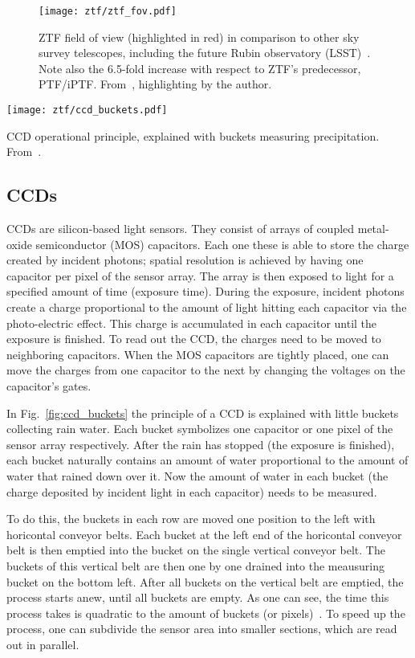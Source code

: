 \begin{figure}[htb]
    \texttt{[image: ztf/ztf\_fov.pdf]}
    \caption[ZTF Field of View]{ZTF field of view (highlighted in red) in comparison to other sky survey telescopes, including the future Rubin observatory (LSST)~\cite{Ivezic2019}. Note also the 6.5-fold increase with respect to ZTF's predecessor, PTF/iPTF. From~\cite{Laher2018}, highlighting by the author.}
\end{figure}

\begin{marginfigure}
    \texttt{[image: ztf/ccd\_buckets.pdf]}
    \caption[CCD operational principle]{CCD operational principle, explained with buckets measuring precipitation. From~\cite{Janesick1987}.}
\end{marginfigure}

\subsection{CCDs}\label{ccd}
CCDs are silicon-based light sensors. They consist of arrays of coupled metal-oxide semiconductor (MOS) capacitors. Each one these is able to store the charge created by incident photons; spatial resolution is achieved by having one capacitor per pixel of the sensor array. The array is then exposed to light for a specified amount of time (exposure time). During the exposure, incident photons create a charge proportional to the amount of light hitting each capacitor via the photo-electric effect. This charge is accumulated in each capacitor until the exposure is finished. To read out the CCD, the charges need to be moved to neighboring capacitors. When the MOS capacitors are tightly placed, one can move the charges from one capacitor to the next by changing the voltages on the capacitor's gates.

In Fig.~\ref{fig:ccd_buckets} the principle of a CCD is explained with little buckets collecting rain water. Each bucket symbolizes one capacitor or one pixel of the sensor array respectively. After the rain has stopped (the exposure is finished), each bucket naturally contains an amount of water proportional to the amount of water that rained down over it. Now the amount of water in each bucket (the charge deposited by incident light in each capacitor) needs to be measured.

To do this, the buckets in each row are moved one position to the left with horicontal conveyor belts. Each bucket at the left end of the horicontal conveyor belt is then emptied into the bucket on the single vertical conveyor belt. The buckets of this vertical belt are then one by one drained into the meausuring bucket on the bottom left. After all buckets on the vertical belt are emptied, the process starts anew, until all buckets are empty. As one can see, the time this process takes is quadratic to the amount of buckets (or pixels)~. To speed up the process, one can subdivide the sensor area into smaller sections, which are read out in parallel.

